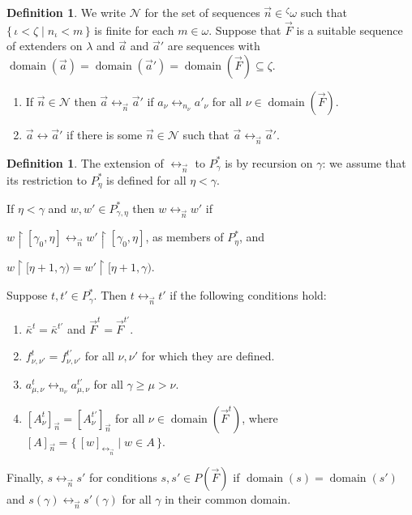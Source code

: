 \documentclass[
twoside,
]{article}
\newenvironment{myinparaenum}{\begin{inparaenum}[\upshape(i)]
}{\end{inparaenum}}
\theoremstyle{definition}
\newtheorem{definition}[theorem]{Definition}
\theoremstyle{remark}
\newcommand{\forceKappa}{\bar\kappa} %
\newcommand\gkeq{\leftrightarrow}
\newcommand{\set}[1]{\{\,#1\,\}}
\newcommand{\restrict}{{\upharpoonright}}
\DeclareMathOperator{\domain}{domain}
\begin{document}
\begin{definition}\label{def:gkeq-a-seq}
    We write $\mathcal{N}$ for the set of sequences
    $\vec n\in{^{\zeta}{\omega}}$ such that
    $\set{\iota<\zeta\mid n_\iota< m}$ is finite for each
    $m\in \omega$.
    Suppose that $\vec F$ is a suitable sequence of extenders on $\lambda$
    and $\vec a$ and $\vec a'$ are sequences with $\domain(\vec
    a)=\domain(\vec a')=\domain(\vec F)\subseteq\zeta$.
    \begin{enumerate}
    \item If $\vec n\in\mathcal{N}$ then $\vec a\gkeq_{\vec n}\vec a'$
      if $a_{\nu}\gkeq_{n_\nu}a'_{\nu}$ for all $\nu\in\domain(\vec
      F)$.
    \item $\vec a\gkeq\vec a'$ if there is some $\vec n\in\mathcal{N}$
      such that $\vec a\gkeq_{\vec n}\vec a'$.
    \end{enumerate}
  \end{definition}
 



\begin{definition}\label{def:gkeq}
  The extension of $\gkeq_{\vec n}$ to $P^*_{\gamma}$ is by recursion on
  $\gamma$:   we assume that its restriction to  $P^*_{\eta}$ is defined for all
  $\eta<\gamma$.
  
  If $\eta<\gamma$ and $w,w'\in P_{\gamma,\eta}^{*}$ then  $w\gkeq_{\vec n}w'$ if
  \begin{myinparaenum}
  \item
    $w\restrict[\gamma_0,\eta]\gkeq_{\vec n} w'\restrict[\gamma_0,\eta]$,
    as members of $P^*_{\eta}$,  and
  \item
    $w\restrict[\eta+1,\gamma)=w'\restrict[\eta+1,\gamma)$.
  \end{myinparaenum}

  Suppose $t,t'\in P^*_{\gamma}$.   Then $t\gkeq_{\vec n}t'$ if the
  following conditions hold:
  \begin{enumerate}
  \item  $\forceKappa^{t}=\forceKappa^{t'}$ and  $\vec F^{t}=\vec
    F^{t'}$.
    
  \item $f^{t}_{\nu,\nu'}=f^{t'}_{\nu,\nu'}$ for all $\nu,\nu'$  for
    which they are defined.
  \item     $a^{t}_{\mu,\nu}\gkeq_{n_\nu}a^{t'}_{\mu,\nu}$ for all $\gamma\geq\mu>\nu$.
  \item\label{item:gkeq_Aeq} $ [A^{t}_{\nu}]_{\vec n}=[A^{t'}_{\nu}]_{\vec n}$ for all
    $\nu\in\domain(\vec F^{t})$, where $[A]_{\vec
      n}=\set{[w]_{\gkeq_{\vec n}}\mid w\in A}$.
  \end{enumerate}
  Finally, 
  $s\gkeq_{\vec n} s'$ for conditions $s,s'\in P(\vec F)$ if
  $\domain(s)=\domain(s')$ and 
  $s(\gamma)\gkeq_{\vec n}s'(\gamma)$ for all $\gamma$ in their
  common domain.
\end{definition}
\end{document}
